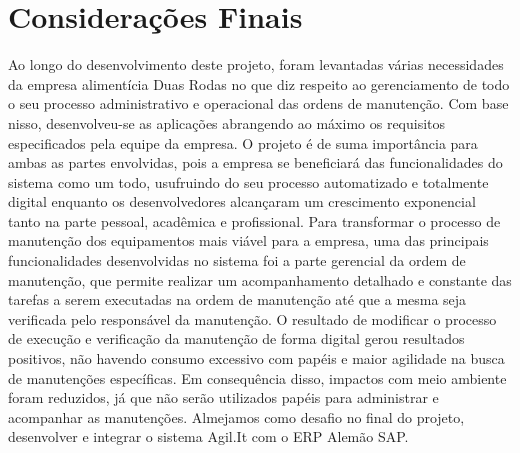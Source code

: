 \chapter{Considerações Finais}






Ao longo do desenvolvimento deste projeto, foram levantadas várias necessidades da empresa alimentícia Duas Rodas no que diz respeito ao gerenciamento de todo o seu processo administrativo e operacional das ordens de manutenção. Com base nisso, desenvolveu-se as aplicações abrangendo ao máximo os requisitos especificados pela equipe da empresa.
O projeto é de suma importância para ambas as partes envolvidas, pois a empresa se beneficiará das funcionalidades do sistema como um todo, usufruindo do seu processo automatizado e totalmente digital enquanto os desenvolvedores alcançaram um crescimento exponencial tanto na parte pessoal, acadêmica e profissional. 
Para transformar o processo de manutenção dos equipamentos mais viável para a empresa, uma das principais funcionalidades desenvolvidas no sistema foi a parte gerencial da ordem de manutenção, que permite realizar um acompanhamento detalhado e constante das tarefas a serem executadas na ordem de manutenção até que a mesma seja verificada pelo responsável da manutenção. 
O resultado de modificar o processo de execução e verificação da manutenção de forma digital gerou resultados positivos, não havendo consumo excessivo com papéis e maior agilidade na busca de manutenções específicas. Em consequência disso, impactos com meio ambiente foram reduzidos, já que não serão utilizados papéis para administrar e acompanhar as manutenções. Almejamos como desafio no final do projeto, desenvolver e integrar o sistema Agil.It com o ERP Alemão SAP.